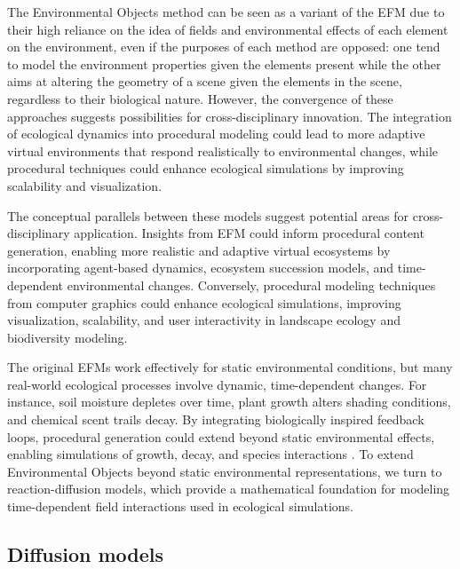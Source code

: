 The Environmental Objects method can be seen as a variant of the EFM due to their high reliance on the idea of fields and environmental effects of each element on the environment, even if the purposes of each method are opposed: one tend to model the environment properties given the elements present while the other aims at altering the geometry of a scene given the elements in the scene, regardless to their biological nature. However, the convergence of these approaches suggests possibilities for cross-disciplinary innovation. The integration of ecological dynamics into procedural modeling could lead to more adaptive virtual environments that respond realistically to environmental changes, while procedural techniques could enhance ecological simulations by improving scalability and visualization.

The conceptual parallels between these models suggest potential areas for cross-disciplinary application. Insights from EFM could inform procedural content generation, enabling more realistic and adaptive virtual ecosystems by incorporating agent-based dynamics, ecosystem succession models, and time-dependent environmental changes. Conversely, procedural modeling techniques from computer graphics could enhance ecological simulations, improving visualization, scalability, and user interactivity in landscape ecology and biodiversity modeling. 

The original EFMs work effectively for static environmental conditions, but many real-world ecological processes involve dynamic, time-dependent changes. For instance, soil moisture depletes over time, plant growth alters shading conditions, and chemical scent trails decay. By integrating biologically inspired feedback loops, procedural generation could extend beyond static environmental effects, enabling simulations of growth, decay, and species interactions \cite{Okubo2001,Wojtek2022}. To extend Environmental Objects beyond static environmental representations, we turn to reaction-diffusion models, which provide a mathematical foundation for modeling time-dependent field interactions used in ecological simulations. 





\subsection{Diffusion models}

